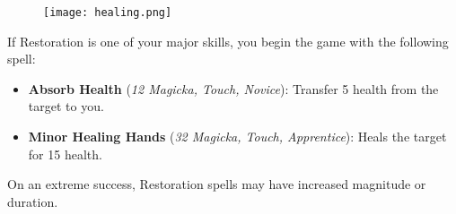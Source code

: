 \begin{figure}[h]
	\texttt{[image: healing.png]}
\end{figure}

If Restoration is one of your major skills, you begin the game with the following spell:
\begin{itemize}
	\item \textbf{Absorb Health} (\textit{12 Magicka, Touch, Novice}): Transfer 5 health from the target to you.
	\item \textbf{Minor Healing Hands} (\textit{32 Magicka, Touch, Apprentice}): Heals the target for 15 health.
\end{itemize}

On an extreme success, Restoration spells may have increased magnitude or duration.
